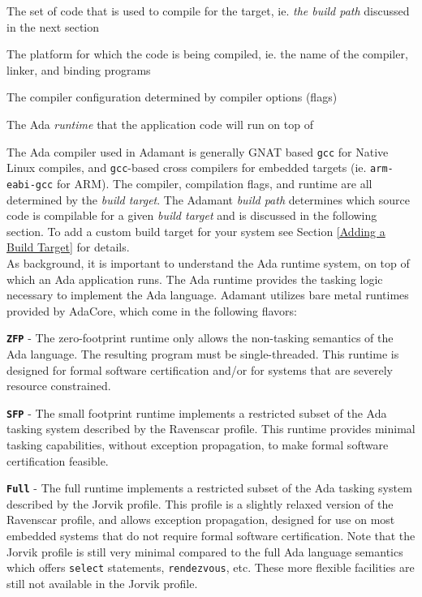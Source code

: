 \vspace{5mm} %
\begin{spacedenumerate}
  \item The set of code that is used to compile for the target, ie. \textit{the build path} discussed in the next section
  \item The platform for which the code is being compiled, ie. the name of the compiler, linker, and binding programs
  \item The compiler configuration determined by compiler options (flags)
  \item The Ada \textit{runtime} that the application code will run on top of
\end{spacedenumerate}
\vspace{5mm} %

The Ada compiler used in Adamant is generally GNAT based \texttt{gcc} for Native Linux compiles, and \texttt{gcc}-based cross compilers for embedded targets (ie. \texttt{arm-eabi-gcc} for ARM). The compiler, compilation flags, and runtime are all determined by the \textit{build target}. The Adamant \textit{build path} determines which source code is compilable for a given \textit{build target} and is discussed in the following section. To add a custom build target for your system see Section \ref{Adding a Build Target} for details. \\

As background, it is important to understand the Ada runtime system, on top of which an Ada application runs. The Ada runtime provides the tasking logic necessary to implement the Ada language. Adamant utilizes bare metal runtimes provided by AdaCore, which come in the following flavors:

\vspace{5mm} %
\begin{spaceditemize}
  \item \textbf{\texttt{ZFP}} - The zero-footprint runtime only allows the non-tasking semantics of the Ada language. The resulting program must be single-threaded. This runtime is designed for formal software certification and/or for systems that are severely resource constrained.
  \item \textbf{\texttt{SFP}} - The small footprint runtime implements a restricted subset of the Ada tasking system described by the Ravenscar profile. This runtime provides minimal tasking capabilities, without exception propagation, to make formal software certification feasible.
  \item \textbf{\texttt{Full}} - The full runtime implements a restricted subset of the Ada tasking system described by the Jorvik profile. This profile is a slightly relaxed version of the Ravenscar profile, and allows exception propagation, designed for use on most embedded systems that do not require formal software certification. Note that the Jorvik profile is still very minimal compared to the full Ada language semantics which offers \texttt{select} statements, \texttt{rendezvous}, etc. These more flexible facilities are still not available in the Jorvik profile.
\end{spaceditemize}
\vspace{5mm} %

